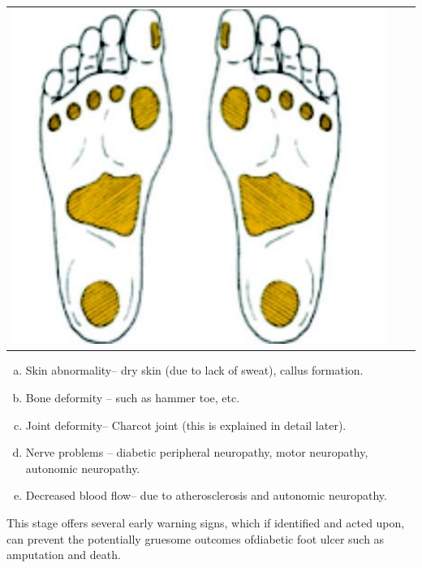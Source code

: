 \begin{center}
\begin{tabular}{@{}ccc@{}}
\includegraphics[scale=.8]{images/062.jpg}
\end{tabular}
\end{center}

\begin{enumerate}[a.]
\itemsep=0pt
\item Skin abnormality– dry skin (due to lack of sweat), callus formation.
\item Bone deformity – such as hammer toe, etc.
\item Joint deformity– Charcot joint (this is explained in detail later).
\item Nerve problems – diabetic peripheral neuropathy, motor neuropathy, autonomic neuro\-pathy.
\item Decreased blood flow– due to atherosclerosis and autonomic neuro\-pathy.
\end{enumerate}

This stage offers several early warning signs, which if identified and acted upon, can prevent the potentially gruesome outcomes of\break diabetic foot ulcer such as amputation and death.

